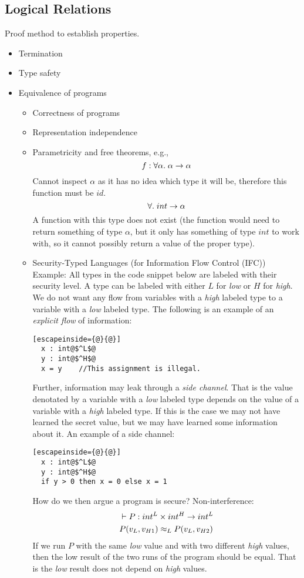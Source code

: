 \subsection*{Logical Relations}
Proof method to establish properties.
\begin{itemize}
\item Termination
\item Type safety
\item Equivalence of programs
  \begin{itemize}
  \item Correctness of programs
  \item Representation independence
  \item Parametricity and free theorems, e.g.,
    \[
    f: \forall \alpha. \;  \alpha \rightarrow \alpha
    \]
    Cannot inspect $\alpha$ as it has no idea which type it will be, therefore this function must be $id$.
    \[
    \forall. \;  int \rightarrow \alpha
    \]
    A function with this type does not exist (the function would need to return something of type $\alpha$, but it only has something of type $int$ to work with, so it cannot possibly return a value of the proper type).
  \item Security-Typed Languages (for Information Flow Control (IFC))\\
        Example: All types in the code snippet below are labeled with their security level. A type can be labeled with either $L$ for \emph{low} or $H$ for \emph{high}. We do not want any flow from variables with a \emph{high} labeled type to a variable with a \emph{low} labeled type. The following is an example of an \emph{explicit flow} of information:
        \begin{lstlisting}[escapeinside={@}{@}]
  x : int@$^L$@
  y : int@$^H$@
  x = y    //This assignment is illegal.
        \end{lstlisting}
Further, information may leak through a \emph{side channel}. That is the value denotated by a variable with a \emph{low} labeled type depends on the value of a variable with a \emph{high} labeled type. If this is the case we may not have learned the secret value, but we may have learned some information about it. An example of a side channel:
        \begin{lstlisting}[escapeinside={@}{@}]
  x : int@$^L$@
  y : int@$^H$@
  if y > 0 then x = 0 else x = 1
        \end{lstlisting}
How do we then argue a program is secure? Non-interference:
\begin{align*}
  & \vdash P :  int^L \times int^H \rightarrow int^L \\
  & P(v_L,v_{H1}) \approx_L P(v_L,v_{H2})
\end{align*}
If we run $P$ with the same \emph{low} value and with two different \emph{high} values, then the low result of the two runs of the program should be equal. That is the \emph{low} result does not depend on \emph{high} values.
  \end{itemize}
\end{itemize}

